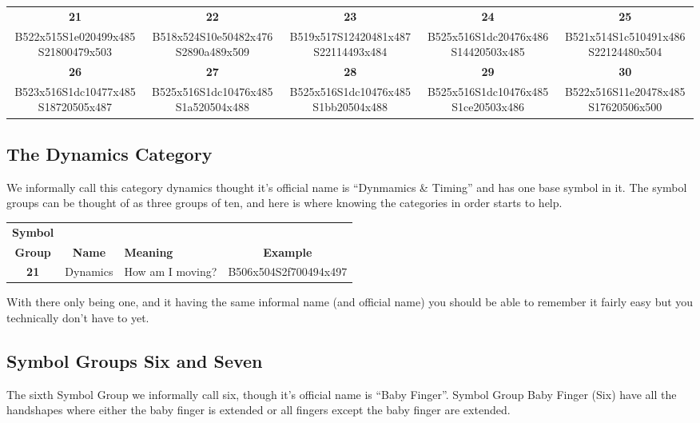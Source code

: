 \documentclass{article}
\begin{document}
\begin{center}
\begin{tabular}{*{5}{c}}
\textbf{21}&\textbf{22}&\textbf{23}&\textbf{24}&\textbf{25}\\
B522x515S1e020499x485S21800479x503&
B518x524S10e50482x476S2890a489x509&
B519x517S12420481x487S22114493x484&
B525x516S1dc20476x486S14420503x485&
B521x514S1c510491x486S22124480x504\\
\textbf{26}&\textbf{27}&\textbf{28}&\textbf{29}&\textbf{30}\\
B523x516S1dc10477x485S18720505x487&
B525x516S1dc10476x485S1a520504x488&
B525x516S1dc10476x485S1bb20504x488&
B525x516S1dc10476x485S1ce20503x486&
B522x516S11e20478x485S17620506x500\\
\end{tabular}
\end{center}

\subsection{The Dynamics Category}

We informally call this category dynamics thought it's official name is ``Dynmamics \& Timing'' and has one base symbol in it.
The symbol groups can be thought of as three groups of ten, and here is where knowing the categories in order starts to help.

\begin{center}
\begin{tabular}{ccp{21mm}c}
\textbf{Symbol}\\
\textbf{Group}&\textbf{Name}&\textbf{Meaning}&\textbf{Example}\\
\textbf{21}&Dynamics&How am I moving?&B506x504S2f700494x497\\
\end{tabular}
\end{center}

With there only being one, and it having the same informal name (and official name) you should be able to remember it fairly easy but you technically don't have to yet.

\subsection{Symbol Groups Six and Seven}

The sixth Symbol Group we informally call six, though it's official name is ``Baby Finger''.
Symbol Group Baby Finger (Six) have all the handshapes where either the baby finger is extended or all fingers except the baby finger are extended.
\end{document}
